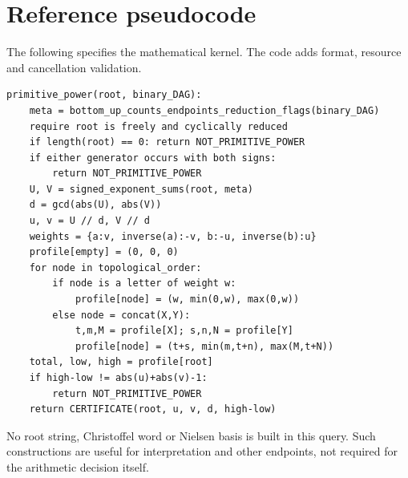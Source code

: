 \documentclass[11pt,letterpaper]{article}
\theoremstyle{definition}
\begin{document}
\section{Reference pseudocode}
\label{app:pseudocode}
The following specifies the mathematical kernel. The code adds format,
resource and cancellation validation.
\begin{lstlisting}
primitive_power(root, binary_DAG):
    meta = bottom_up_counts_endpoints_reduction_flags(binary_DAG)
    require root is freely and cyclically reduced
    if length(root) == 0: return NOT_PRIMITIVE_POWER
    if either generator occurs with both signs:
        return NOT_PRIMITIVE_POWER
    U, V = signed_exponent_sums(root, meta)
    d = gcd(abs(U), abs(V))
    u, v = U // d, V // d
    weights = {a:v, inverse(a):-v, b:-u, inverse(b):u}
    profile[empty] = (0, 0, 0)
    for node in topological_order:
        if node is a letter of weight w:
            profile[node] = (w, min(0,w), max(0,w))
        else node = concat(X,Y):
            t,m,M = profile[X]; s,n,N = profile[Y]
            profile[node] = (t+s, min(m,t+n), max(M,t+N))
    total, low, high = profile[root]
    if high-low != abs(u)+abs(v)-1:
        return NOT_PRIMITIVE_POWER
    return CERTIFICATE(root, u, v, d, high-low)
\end{lstlisting}
No root string, Christoffel word or Nielsen basis is built in this query.
Such constructions are useful for interpretation and other endpoints, not
required for the arithmetic decision itself.
\end{document}
